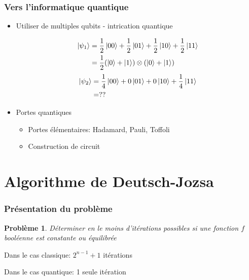 \documentclass{beamer}
\newtheorem{pb}{Problème}
\begin{document}
\begin{frame}
  \frametitle{Vers l'informatique quantique}
  \begin{itemize}
    \item Utiliser de multiples qubits - intrication quantique
    
    \begin{align}
      \ket{\psi_1} &= \frac{1}{2}\ket{00} + \frac{1}{2}\ket{01} + \frac{1}{2}\ket{10} +\frac{1}{2}\ket{11} \nonumber \\
                   &= \frac{1}{2} (\ket{0} + \ket{1}) \otimes (\ket{0} + \ket{1})  \nonumber
    \end{align}
    \begin{align}
      \ket{\psi_2} &= \frac{1}{4}\ket{00} + 0\ket{01} + 0\ket{10} +\frac{1}{4}\ket{11} \nonumber \\
                   &= ?? \nonumber
    \end{align}

    \item Portes quantiques
    \begin{itemize}
      \item Portes élémentaires: Hadamard, Pauli, Toffoli
      \item Construction de circuit
    \end{itemize}
  \end{itemize}
\end{frame}


\section{Algorithme de Deutsch-Jozsa}

\begin{frame}
\frametitle{Présentation du problème}

\begin{pb}
  Déterminer en le moins d'itérations possibles si une fonction $f$ booléenne est constante ou équilibrée
\end{pb}

\medbreak
Dans le cas classique: $2^{n-1} + 1$ itérations

\medbreak
Dans le cas quantique: 1 seule itération

\end{frame}
\end{document}
